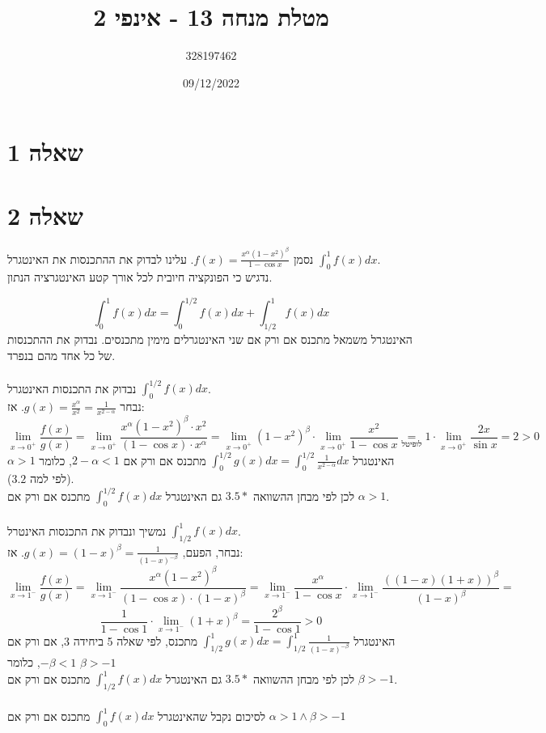 \documentclass{article}
\title{מטלת מנחה 13 - אינפי 2}
\author{328197462}
\date{09/12/2022}
\newcommand\underrel[2]{\mathrel{\mathop{#2}\limits_{#1}}}
\begin{document}
\maketitle

\section*{שאלה 1}

\pagebreak

\section*{שאלה 2}

נסמן $f(x)=\frac{x^\alpha(1-x^2)^\beta}{1-\cos x}$.
עלינו לבדוק את ההתכנסות את האינטגרל $\int_0^1f(x)dx$. \\
נדגיש כי הפונקציה חיובית לכל אורך קטע האינטגרציה הנתון.

\[
    \int_0^1 f(x) dx = \int_0^{1/2}f(x)dx + \int_{1/2}^1f(x)dx
\]
האינטגרל משמאל מתכנס אם ורק אם שני האינטגרלים מימין מתכנסים. נבדוק את ההתכנסות של כל אחד מהם בנפרד.
\\\\
נבדוק את התכנסות האינטגרל $\int_0^{1/2}f(x)dx$. \\
נבחר $g(x) = \frac{x^\alpha}{x^2}=\frac{1}{x^{2-\alpha}}$. אז:
\[
    \lim_{x\rightarrow 0^+}\frac{f(x)}{g(x)} =
    \lim_{x\rightarrow 0^+}\frac{x^\alpha(1-x^2)^\beta \cdot x^2}{(1-\cos x)\cdot x^\alpha} =
    \lim_{x\rightarrow 0^+} (1-x^2)^\beta \cdot \lim_{x\rightarrow 0^+} \frac{x^2}{1-\cos x} \underrel{\text{לופיטל}}{=}
    1 \cdot \lim_{x\rightarrow 0^+} \frac{2x}{\sin x} = 2 > 0
\]
האינטגרל $\int_0^{1/2}g(x)dx=\int_0^{1/2}\frac{1}{x^{2-\alpha}}dx$
מתכנס אם ורק אם $2-\alpha < 1$,
כלומר $\alpha > 1$
(לפי למה $3.2$). \\
לכן לפי מבחן ההשוואה $3.5*$
גם האינטגרל $\int_0^{1/2}f(x)dx$
מתכנס אם ורק אם $\alpha > 1$.
\\\\
נמשיך ונבדוק את התכנסות האינטרל $\int_{1/2}^1f(x)dx$. \\
נבחר, הפעם, $g(x)=(1-x)^\beta=\frac{1}{(1-x)^{-\beta}}$. אז:
\[
    \lim_{x\rightarrow 1^-} \frac{f(x)}{g(x)} =
    \lim_{x\rightarrow 1^-} \frac{x^\alpha (1-x^2)^\beta}{(1-\cos x)\cdot (1-x)^\beta} =
    \lim_{x\rightarrow 1^-} \frac{x^\alpha}{1-\cos x} \cdot \lim_{x\rightarrow 1^-} \frac{((1-x)(1+x))^\beta}{(1-x)^\beta} =
\]
\[
    \frac{1}{1-\cos 1} \cdot \lim_{x\rightarrow 1^-} (1+x)^\beta =
    \frac{2^\beta}{1-\cos 1} > 0
\]
האינטגרל $\int_{1/2}^1g(x)dx = \int_{1/2}^1\frac{1}{(1-x)^{-\beta}}$
מתכנס, לפי שאלה 5 ביחידה 3, אם ורק אם $-\beta < 1$, כלומר $\beta > -1$ \\
לכן לפי מבחן ההשוואה $3.5*$
גם האינטגרל $\int_{1/2}^1f(x)dx$
מתכנס אם ורק אם $\beta > -1$.
\\\\
לסיכום נקבל שהאינטגרל $\int_0^1f(x)dx$
מתכנס אם ורק אם $\alpha > 1\wedge \beta > -1$
\end{document}
